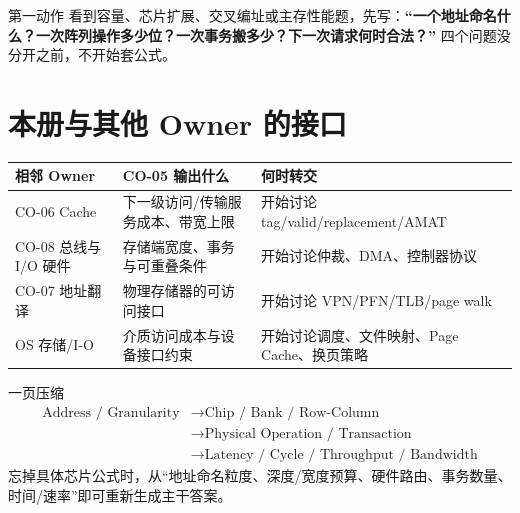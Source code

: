\documentclass[UTF8,fontset=fandol,11pt,a4paper]{ctexart}
\newcommand{\kw}[1]{\textbf{\color{deep}#1}}\newcommand{\code}[1]{\texttt{#1}}
\begin{document}
\begin{methodbox}{第一动作}
看到容量、芯片扩展、交叉编址或主存性能题，先写：\kw{“一个地址命名什么？一次阵列操作多少位？一次事务搬多少？下一次请求何时合法？”} 四个问题没分开之前，不开始套公式。
\end{methodbox}

\section{本册与其他 Owner 的接口}
\begin{center}\small
\begin{tabularx}{\linewidth}{L{3cm}YY}
\toprule
相邻 Owner & CO-05 输出什么 & 何时转交\\\midrule
CO-06 Cache & 下一级访问/传输服务成本、带宽上限 & 开始讨论 tag/valid/replacement/AMAT\\
CO-08 总线与 I/O 硬件 & 存储端宽度、事务与可重叠条件 & 开始讨论仲裁、DMA、控制器协议\\
CO-07 地址翻译 & 物理存储器的可访问接口 & 开始讨论 VPN/PFN/TLB/page walk\\
OS 存储/I-O & 介质访问成本与设备接口约束 & 开始讨论调度、文件映射、Page Cache、换页策略\\
\bottomrule
\end{tabularx}
\end{center}

\begin{corebox}{一页压缩}
\[
\boxed{
\begin{aligned}
\text{Address / Granularity}
&\to\text{Chip / Bank / Row-Column}\\
&\to\text{Physical Operation / Transaction}\\
&\to\text{Latency / Cycle / Throughput / Bandwidth}
\end{aligned}}
\]
忘掉具体芯片公式时，从“地址命名粒度、深度/宽度预算、硬件路由、事务数量、时间/速率”即可重新生成主干答案。
\end{corebox}
\end{document}
